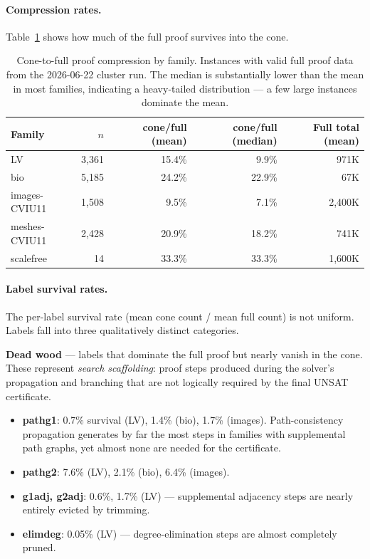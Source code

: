 \documentclass[11pt,a4paper]{article}
\begin{document}
\paragraph{Compression rates.}
Table~\ref{tab:cone-vs-full-compression} shows how much of the full proof survives into the cone.

\begin{table}[h]
\centering
\begin{tabular}{lrrrr}
\toprule
Family & $n$ & cone/full (mean) & cone/full (median) & Full total (mean) \\
\midrule
LV            & 3,361 & 15.4\% &  9.9\% &   971K \\
bio           & 5,185 & 24.2\% & 22.9\% &    67K \\
images-CVIU11 & 1,508 &  9.5\% &  7.1\% & 2,400K \\
meshes-CVIU11 & 2,428 & 20.9\% & 18.2\% &   741K \\
scalefree     &    14 & 33.3\% & 33.3\% & 1,600K \\
\bottomrule
\end{tabular}
\caption{Cone-to-full proof compression by family.
Instances with valid full proof data from the 2026-06-22 cluster run.
The median is substantially lower than the mean in most families, indicating a heavy-tailed
distribution — a few large instances dominate the mean.}
\label{tab:cone-vs-full-compression}
\end{table}

\paragraph{Label survival rates.}
The per-label survival rate (mean cone count / mean full count) is not uniform.
Labels fall into three qualitatively distinct categories.

\textbf{Dead wood} --- labels that dominate the full proof but nearly vanish in the cone.
These represent \emph{search scaffolding}: proof steps produced during the solver's propagation
and branching that are not logically required by the final UNSAT certificate.

\begin{itemize}
  \item \textbf{pathg1}: 0.7\% survival (LV), 1.4\% (bio), 1.7\% (images).
    Path-consistency propagation generates by far the most steps in families with supplemental
    path graphs, yet almost none are needed for the certificate.
  \item \textbf{pathg2}: 7.6\% (LV), 2.1\% (bio), 6.4\% (images).
  \item \textbf{g1adj, g2adj}: 0.6\%, 1.7\% (LV) --- supplemental adjacency steps are nearly
    entirely evicted by trimming.
  \item \textbf{elimdeg}: 0.05\% (LV) --- degree-elimination steps are almost completely pruned.
\end{itemize}
\end{document}
